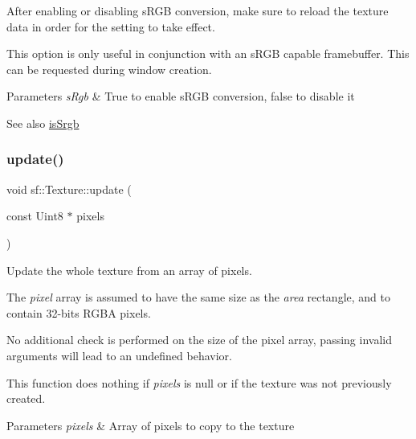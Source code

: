 After enabling or disabling s\+R\+GB conversion, make sure to reload the texture data in order for the setting to take effect.

This option is only useful in conjunction with an s\+R\+GB capable framebuffer. This can be requested during window creation.


\begin{DoxyParams}{Parameters}
{\em s\+Rgb} & True to enable s\+R\+GB conversion, false to disable it\\
\hline
\end{DoxyParams}
\begin{DoxySeeAlso}{See also}
\hyperlink{classsf_1_1_texture_a9d77ce4f8124abfda96900a6bd53bfe9}{is\+Srgb} 
\end{DoxySeeAlso}
\mbox{\label{classsf_1_1_texture_ae4eab5c6781316840b0c50ad08370963}} 
\subsubsection{\texorpdfstring{update()}{update()}\hspace{0.1cm}{\footnotesize\ttfamily [1/6]}}
{\footnotesize\ttfamily void sf\+::\+Texture\+::update (\begin{DoxyParamCaption}\item[{const Uint8 $\ast$}]{pixels }\end{DoxyParamCaption})}



Update the whole texture from an array of pixels. 

The {\itshape pixel} array is assumed to have the same size as the {\itshape area} rectangle, and to contain 32-\/bits R\+G\+BA pixels.

No additional check is performed on the size of the pixel array, passing invalid arguments will lead to an undefined behavior.

This function does nothing if {\itshape pixels} is null or if the texture was not previously created.


\begin{DoxyParams}{Parameters}
{\em pixels} & Array of pixels to copy to the texture \\
\hline
\end{DoxyParams}
\mbox{\label{classsf_1_1_texture_a1352d8e16c2aeb4df586ed65dd2c36b9}} 
